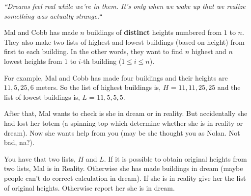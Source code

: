 \textit{``Dreams feel real while we're in them. It's only when we wake up that we realize something was actually strange.``}

Mal and Cobb has made $n$ buildings of \textbf{distinct} heights numbered from $1$ to $n$. They also make two lists of highest and lowest buildings (based on height) from first to each building. In the other words, they want to find $n$ highest and $n$ lowest heights from $1$ to $i$-th building ($1 \le i \le n$).

For example, Mal and Cobb has made four buildings and their heights are ${11, 5, 25, 6}$ meters. So the list of highest buildings is, $H$ = ${11, 11, 25, 25}$ and the list of lowest buildings is, $L$ =  ${11, 5, 5, 5}$.

After that, Mal wants to check is she in dream or in reality. But accidentally she had lost her totem (a spinning top which determine whether she is in reality or dream). Now she wants help from you (may be she thought you as Nolan. Not bad, na?). 

You have that two lists, $H$ and $L$. If it is possible to obtain original heights from two lists, Mal is in Reality. Otherwise she has made buildings in dream (maybe people can't do correct calculation in dream). If she is in reality give her the list of original heights. Otherwise report her she is in dream.